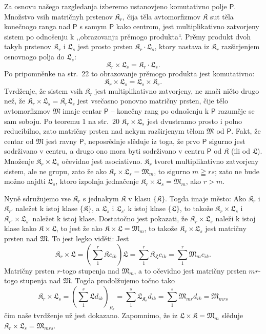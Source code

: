 \documentclass[11pt]{article}
\begin{document}
Za osnovu našego razgledanja izberemo ustanovjeno komutativno polje \(\mathsf P\). Množstvo vsih matričnyh prstenov \(\mathfrak K_r\), čija těla avtomorfizmov \(\mathfrak K\) sut těla konečnogo ranga nad \(\mathsf P\) s samym \(\mathsf P\) kako centrom, jest multiplikativno zatvorjeny sistem po odnošenju k ,,obrazovanju prěmogo produkta``. Prěmy produkt dvoh takyh prstenov \(\mathfrak K_r\) i \(\mathfrak L_s\) jest prosto prsten \(\mathfrak K_r\cdot\mathfrak L_s\), ktory nastava iz \(\mathfrak K_r\) razširjenjem osnovnogo polja do \(\mathfrak L_s\):
\[
\mathfrak K_r\times\mathfrak L_s=\mathfrak K_r\cdot\mathfrak L_s.
\]
Po pripomněnke na str.~22 to obrazovanje prěmogo produkta jest komutativno:
\[
\mathfrak K_r\times\mathfrak L_s=\mathfrak L_s\times\mathfrak K_r.
\]
Tvrdženje, že sistem vsih \(\mathfrak K_r\) jest multiplikativno zatvorjeny, ne znači ničto drugo než, že \(\mathfrak K_r\times\mathfrak L_s=\mathfrak K_r\mathfrak L_s\) jest vsečasno ponovno matričny prsten, čije tělo avtomorfizmov \(\mathfrak M\) imaje centar \(\mathsf P\) -- konečny rang po odnošenju k \(\mathsf P\) razuměje se sam soboju. Po teoremu 1 na str.~20 \(\mathfrak K_r\times\mathfrak L_s\) jest dvustranno prosto i polno reducibilno, zato matričny prsten nad nekym razširjenym tělom \(\mathfrak M\) od \(\mathsf P\). Fakt, že centar od \(\mathfrak M\) jest ravny \(\mathsf P\), neposrědnje slěduje iz toga, že prvo \(\mathsf P\) sigurno jest sodrživano v centru, a drugo ono mora byti sodrživano v centru \(\mathsf P\) od \(\mathfrak K\) (ili od \(\mathfrak L\)). Množenje \(\mathfrak K_r\times\mathfrak L_s\) očevidno jest asociativno. \(\mathfrak K_r\) tvoret multiplikativno zatvorjeny sistem, ale ne grupu, zato že ako \(\mathfrak K_r\times\mathfrak L_s=\mathfrak M_m\), to sigurno \(m\geqq rs\); zato ne bude možno najdti \(\mathfrak L_s\), ktoro izpolnja jednačenje \(\mathfrak K_r\times\mathfrak L_s=\mathfrak M_m\), ako \(r>m\).

Nyně sdružujemo vse \(\mathfrak K_r\) s jednakym \(\mathfrak K\) v klasu \(\{\mathfrak K\}\). Togda imaje město: Ako \(\mathfrak K_r\) i \(\mathfrak K_{r'}\) naležet k istoj klase \(\{\mathfrak K\}\), a \(\mathfrak L_s\) i \(\mathfrak L_{s'}\) k istoj klase \(\{\mathfrak L\}\), to takože \(\mathfrak K_r\times\mathfrak L_s\) i \(\mathfrak K_{r'}\times\mathfrak L_{s'}\) naležet k istoj klase. Dostatočno jest pokazati, že \(\mathfrak K_r\times\mathfrak L_s\) naleži k istoj klase kako \(\mathfrak K\times\mathfrak L\), to jest že ako \(\mathfrak K\times\mathfrak L=\mathfrak M_m\), to takože \(\mathfrak K_r\times\mathfrak L_s\) jest matričny prsten nad \(\mathfrak M\). To jest legko viděti: Jest
\[
\mathfrak K_r\times\mathfrak L
=\left(\sum_1^r\mathfrak K c_{ik}\right)\mathfrak L
=\sum_1^r\mathfrak K_{\mathfrak L}c_{ik}
=\sum_1^r\mathfrak M_m c_{ik}.
\]
Matričny prsten \(r\)-togo stupenja nad \(\mathfrak M_m\), a to očevidno jest matričny prsten \(mr\)-togo stupenja nad \(\mathfrak M\). Togda prodolžujemo točno tako
\[
\mathfrak K_r\times\mathfrak L_s
=\left(\sum_1^s\mathfrak L d_{ik}\right)_{\mathfrak K_r}
=\sum_1^s\mathfrak L_{\mathfrak K_r}d_{ik}
=\sum_1^s\mathfrak M_{mr}d_{ik}
=\mathfrak M_{mrs}
\]
čim naše tvrdženje už jest dokazano. Zapomnimo, že iz \(\mathfrak L\times\mathfrak K=\mathfrak M_m\) slěduje \(\mathfrak K_r\times\mathfrak L_s=\mathfrak M_{mrs}\).
\end{document}
